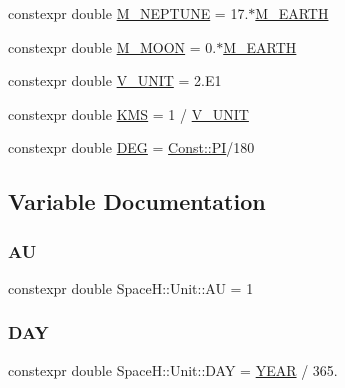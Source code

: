 \begin{DoxyCompactItemize}
\item 
constexpr double \mbox{\hyperlink{namespace_space_h_1_1_unit_aa5e34a70455ece7b0d0461b2100d2e37}{M\+\_\+\+N\+E\+P\+T\+U\+NE}} = 17.$\ast$\mbox{\hyperlink{namespace_space_h_1_1_unit_af411a7d1df0c45c90d4f2e23fd96de94}{M\+\_\+\+E\+A\+R\+TH}}
\item 
constexpr double \mbox{\hyperlink{namespace_space_h_1_1_unit_a06ca6cd52ca75780258cbe237788d27c}{M\+\_\+\+M\+O\+ON}} = 0.$\ast$\mbox{\hyperlink{namespace_space_h_1_1_unit_af411a7d1df0c45c90d4f2e23fd96de94}{M\+\_\+\+E\+A\+R\+TH}}
\item 
constexpr double \mbox{\hyperlink{namespace_space_h_1_1_unit_a08a0bb62e0888ec690dd0e70a415e3fb}{V\+\_\+\+U\+N\+IT}} = 2.\+E1
\item 
constexpr double \mbox{\hyperlink{namespace_space_h_1_1_unit_a94c0a976eb50dcc88f04f3513049e8c3}{K\+MS}} = 1 / \mbox{\hyperlink{namespace_space_h_1_1_unit_a08a0bb62e0888ec690dd0e70a415e3fb}{V\+\_\+\+U\+N\+IT}}
\item 
constexpr double \mbox{\hyperlink{namespace_space_h_1_1_unit_ad18c80501bf460d50d363aecc5d933e8}{D\+EG}} = \mbox{\hyperlink{namespace_space_h_1_1_const_afdcc70c6f78ec4cf7baad3525ba7c618}{Const\+::\+PI}}/180
\end{DoxyCompactItemize}


\subsection{Variable Documentation}
\mbox{\label{namespace_space_h_1_1_unit_a3851fdb2c14e9823ba0a46b68f99d6f9}} 
\subsubsection{\texorpdfstring{AU}{AU}}
{\footnotesize\ttfamily constexpr double Space\+H\+::\+Unit\+::\+AU = 1}

\mbox{\label{namespace_space_h_1_1_unit_a1f85dcd972f4336bccee277f6bb2654c}} 
\subsubsection{\texorpdfstring{D\+AY}{DAY}}
{\footnotesize\ttfamily constexpr double Space\+H\+::\+Unit\+::\+D\+AY = \mbox{\hyperlink{namespace_space_h_1_1_unit_a386ecd4744a86ce94e14270b1305fc62}{Y\+E\+AR}} / 365.}

